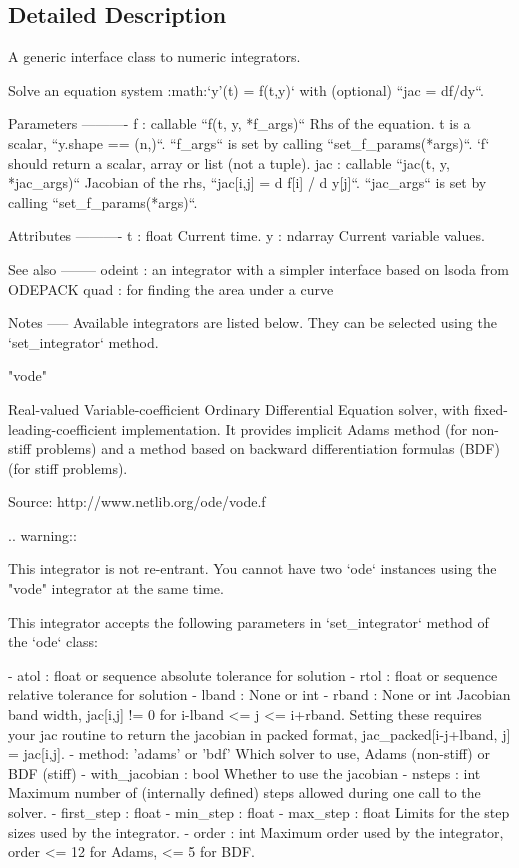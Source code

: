 \subsection{Detailed Description}
\begin{DoxyVerb}A generic interface class to numeric integrators.

Solve an equation system :math:`y'(t) = f(t,y)` with (optional) ``jac = df/dy``.

Parameters
----------
f : callable ``f(t, y, *f_args)``
    Rhs of the equation. t is a scalar, ``y.shape == (n,)``.
    ``f_args`` is set by calling ``set_f_params(*args)``.
    `f` should return a scalar, array or list (not a tuple).
jac : callable ``jac(t, y, *jac_args)``
    Jacobian of the rhs, ``jac[i,j] = d f[i] / d y[j]``.
    ``jac_args`` is set by calling ``set_f_params(*args)``.

Attributes
----------
t : float
    Current time.
y : ndarray
    Current variable values.

See also
--------
odeint : an integrator with a simpler interface based on lsoda from ODEPACK
quad : for finding the area under a curve

Notes
-----
Available integrators are listed below. They can be selected using
the `set_integrator` method.

"vode"

    Real-valued Variable-coefficient Ordinary Differential Equation
    solver, with fixed-leading-coefficient implementation. It provides
    implicit Adams method (for non-stiff problems) and a method based on
    backward differentiation formulas (BDF) (for stiff problems).

    Source: http://www.netlib.org/ode/vode.f

    .. warning::

       This integrator is not re-entrant. You cannot have two `ode`
       instances using the "vode" integrator at the same time.

    This integrator accepts the following parameters in `set_integrator`
    method of the `ode` class:

    - atol : float or sequence
      absolute tolerance for solution
    - rtol : float or sequence
      relative tolerance for solution
    - lband : None or int
    - rband : None or int
      Jacobian band width, jac[i,j] != 0 for i-lband <= j <= i+rband.
      Setting these requires your jac routine to return the jacobian
      in packed format, jac_packed[i-j+lband, j] = jac[i,j].
    - method: 'adams' or 'bdf'
      Which solver to use, Adams (non-stiff) or BDF (stiff)
    - with_jacobian : bool
      Whether to use the jacobian
    - nsteps : int
      Maximum number of (internally defined) steps allowed during one
      call to the solver.
    - first_step : float
    - min_step : float
    - max_step : float
      Limits for the step sizes used by the integrator.
    - order : int
      Maximum order used by the integrator,
      order <= 12 for Adams, <= 5 for BDF.


\end{DoxyVerb}
